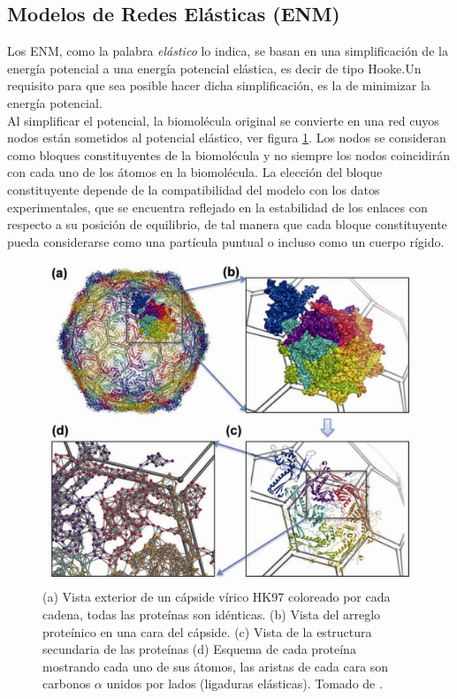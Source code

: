\subsection{Modelos de Redes El\'{a}sticas (ENM)}
Los ENM, como la palabra \textit{el\'{a}stico} lo indica, se basan en una simplificaci\'{o}n de la energ\'{i}a potencial a una energ\'{i}a potencial el\'{a}stica, es decir de tipo Hooke.Un requisito para que sea posible hacer dicha simplificaci\'{o}n, es la de minimizar la energ\'{i}a potencial. \\

Al simplificar el potencial, la biomol\'{e}cula original se convierte en una red cuyos nodos est\'{a}n sometidos al potencial el\'{a}stico, ver figura \ref{fig:pan}. Los nodos se consideran como bloques constituyentes de la biomol\'{e}cula y no siempre los nodos coincidir\'{a}n con cada uno de los \'{a}tomos en la biomol\'{e}cula. La elecci\'{o}n del bloque constituyente depende de la compatibilidad del modelo con los datos experimentales, que se encuentra reflejado en la estabilidad de los enlaces con respecto a su posici\'{o}n de equilibrio, de tal manera que cada bloque constituyente pueda considerarse como una part\'{i}cula puntual o incluso como un cuerpo r\'{i}gido. \\
\begin{figure}
\centering%
\includegraphics[scale=0.3]{Kap2/dibujo.pdf}%
\caption{ (a) Vista exterior de un c\'{a}pside v\'{i}rico HK97 coloreado por cada cadena, todas las prote\'{i}nas son id\'{e}nticas. (b) Vista del arreglo prote\'{i}nico en una cara del c\'{a}pside. (c) Vista de la estructura secundaria de las prote\'{i}nas (d) Esquema de cada prote\'{i}na mostrando cada uno de sus \'{a}tomos, las aristas de cada cara son carbonos $\alpha$ unidos por lados (ligaduras el\'{a}sticas). Tomado de \cite{Lezon2009ElasticViruses}.} \label{fig:pan}
\end{figure}
